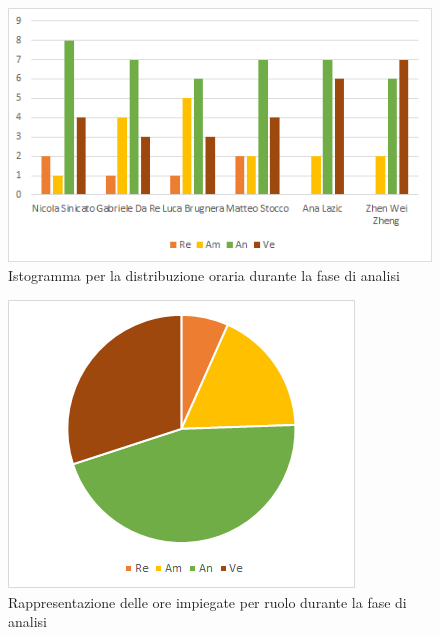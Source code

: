 \begin{figure}[H]
    \centering
    \includegraphics[scale=0.6]{img/grafi preventivo/istogrammi/analisi/periodo2.png}
    \caption{Istogramma per la distribuzione oraria durante la fase di analisi}
\end{figure}
\begin{figure}[H]
    \centering
    \includegraphics[scale=0.6]{img/grafi preventivo/torta/analisi/periodo2.png}
    \caption{Rappresentazione delle ore impiegate per ruolo durante la fase di analisi}
\end{figure}
%

